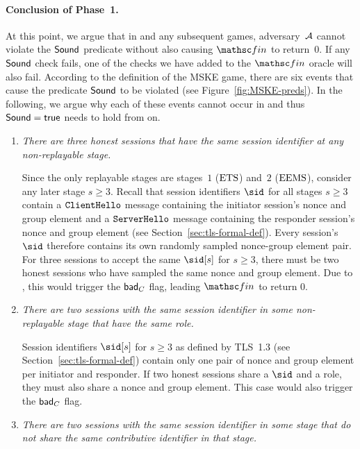 	\paragraph{Conclusion of Phase~1.}
	At this point, we argue that in \thisGame and any subsequent games, adversary~$\mathcal{A}$ cannot violate the $\mathsf{Sound}$ predicate without also causing $\Finalize$ to return~$0$.
	If any $\mathsf{Sound}$ check fails, one of the checks we have added to the $\Finalize$ oracle will also fail.
	According to the definition of the MSKE game, there are six events that cause the predicate $\mathsf{Sound}$ to be violated (see Figure~\ref{fig:MSKE-preds}).
	In the following, we argue why each of these events cannot occur in \thisGame and thus $\mathsf{Sound} = \mathsf{true}$ needs to hold from \thisGame on.
	\begin{enumerate}
		\item \textit{There are three honest sessions that have the same session identifier at any non-replayable stage.}
		
		Since the only replayable stages are stages~$1$ ($\mathrm{ETS}$) and~$2$ ($\mathrm{EEMS}$), consider any later stage $s \geq 3$.
		Recall that session identifiers $\sid$ for all stages $s\geq 3$ contain a $\mathtt{ClientHello}$ message containing the initiator session's nonce and group element and a $\mathtt{ServerHello}$ message containing the responder session's nonce and group element (see Section~\ref{sec:tls-formal-def}).
		Every session's $\sid$ therefore contains its own randomly sampled nonce-group element pair.
		For three sessions to accept the same $\sid[s]$ for $s \geq 3$, there must be two honest sessions who have sampled the same nonce and group element.
		Due to , this would trigger the $\mathsf{bad}_C$ flag, leading $\Finalize$ to return $0$.
		
		\item \textit{There are two sessions with the same session identifier in some non-replayable stage that have the same role.}
		
		Session identifiers $\sid[s]$ for $s \geq 3$ as defined by TLS~1.3 (see Section~\ref{sec:tls-formal-def}) contain only one pair of nonce and group element per initiator and responder.
		If two honest sessions share a $\sid$ and a role, they must also share a nonce and group element.
		This case would also trigger the $\mathsf{bad}_C$ flag. 
		
		\item \textit{There are two sessions with the same session identifier in some stage that do not share the same contributive identifier in that stage.}
		

\end{enumerate}
